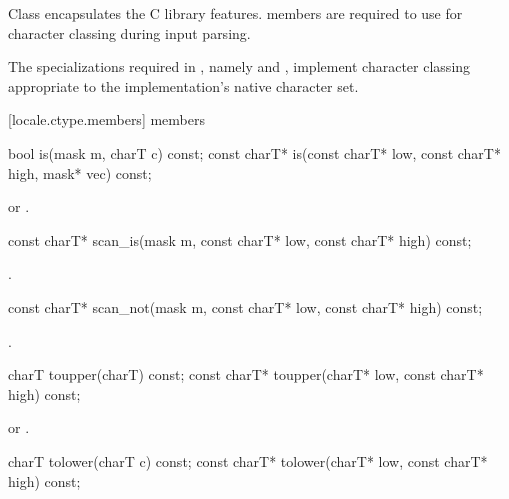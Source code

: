 \pnum
Class  encapsulates the C library  features.
members are required to use
for character classing during input parsing.

\pnum
The specializations required in , namely
and
,
implement character classing appropriate
to the implementation's native character set.

[locale.ctype.members]{ members}

%
\begin{itemdecl}
bool         is(mask m, charT c) const;
const charT* is(const charT* low, const charT* high, mask* vec) const;
\end{itemdecl}

\begin{itemdescr}
\pnum
\returns
{}
or
.
\end{itemdescr}

%
\begin{itemdecl}
const charT* scan_is(mask m, const charT* low, const charT* high) const;
\end{itemdecl}

\begin{itemdescr}
\pnum
\returns
{}.
\end{itemdescr}

%
\begin{itemdecl}
const charT* scan_not(mask m, const charT* low, const charT* high) const;
\end{itemdecl}

\begin{itemdescr}
\pnum
\returns
{}.
\end{itemdescr}

%
\begin{itemdecl}
charT        toupper(charT) const;
const charT* toupper(charT* low, const charT* high) const;
\end{itemdecl}

\begin{itemdescr}
\pnum
\returns
{}
or
.
\end{itemdescr}

%
\begin{itemdecl}
charT        tolower(charT c) const;
const charT* tolower(charT* low, const charT* high) const;
\end{itemdecl}

